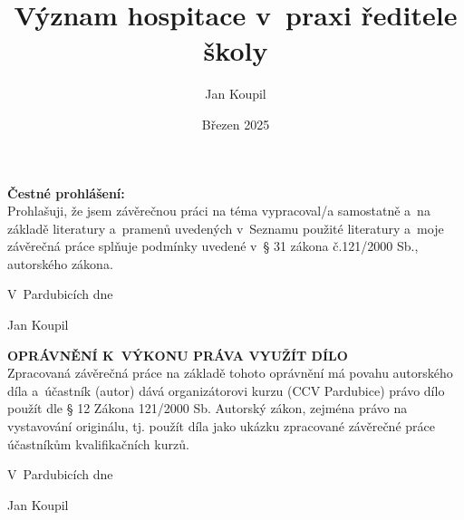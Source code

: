 

\author{Jan Koupil}
\title{Význam hospitace v~praxi ředitele školy}
\date{Březen 2025}




\newpage

\setcounter{page}{2}

\vspace*{\fill}

\noindent \textbf{Čestné prohlášení:} \\

Prohlašuji, že jsem závěrečnou práci na téma \textbf{\topic}
vypracoval/a samostatně a~na základě literatury a~pramenů uvedených v~Seznamu použité literatury a~moje závěrečná práce splňuje podmínky uvedené v~§ 31 zákona č.121/2000 Sb., autorského zákona.

\vspace{1cm}

\hfill V~Pardubicích dne \dotfill  
\vspace{1cm}

\hfill
Jan Koupil

\newpage

\vspace*{\fill}

\noindent \textbf{OPRÁVNĚNÍ K~VÝKONU PRÁVA VYUŽÍT DÍLO} \\

Zpracovaná závěrečná práce na základě tohoto oprávnění má povahu autorského díla a~účastník (autor) dává organizátorovi kurzu (CCV Pardubice) právo dílo použít dle § 12 Zákona 121/2000 Sb. Autorský zákon, zejména právo na vystavování originálu, tj. použít díla jako ukázku zpracované závěrečné práce účastníkům kvalifikačních kurzů.

\vspace{1cm}

\hfill V~Pardubicích dne \dotfill  

\hfill
Jan Koupil

\newpage
